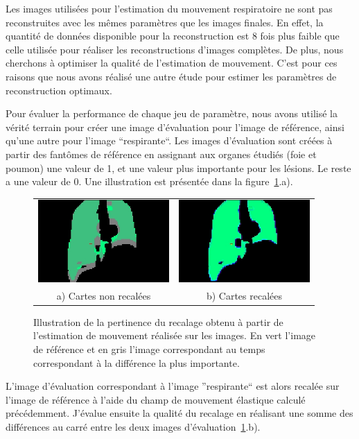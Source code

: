 Les images utilisées pour l'estimation du mouvement respiratoire ne sont pas reconstruites avec les mêmes paramètres que les images finales. En effet, la quantité de données disponible pour la reconstruction est 8 fois plus faible que celle utilisée pour réaliser les reconstructions d'images complètes. De plus, nous cherchons à optimiser la qualité de l'estimation de mouvement. C'est pour ces raisons que nous avons réalisé une autre étude pour estimer les paramètres de reconstruction optimaux. 

Pour évaluer la performance de chaque jeu de paramètre, nous avons utilisé la vérité terrain pour créer une image d'évaluation pour l'image de référence, ainsi qu'une autre pour l'image ``respirante``. Les images d'évaluation sont créées à partir des fantômes de référence en assignant aux organes étudiés (foie et poumon) une valeur de 1, et une valeur plus importante pour les lésions. Le reste a une valeur de 0. Une illustration est présentée dans la figure~\ref{lab:illustrationRecalage}.a). 

\begin{figure}
\centering
\begin{tabular}{c c}
	\includegraphics[width=5cm]{images/sansCorrection} & \includegraphics[width=5cm]{images/avecCorrection} \\
	a) Cartes non recalées				& b) Cartes recalées
\end{tabular}
\caption[Illustration du recalage obtenu]{Illustration de la pertinence du recalage obtenu à partir de l'estimation de mouvement réalisée sur les images. En vert l'image de référence et en gris l'image correspondant au temps correspondant à la différence la plus importante. }
\label{lab:illustrationRecalage}
\end{figure}

L'image d'évaluation correspondant à l'image ''respirante`` est alors recalée sur l'image de référence à l'aide du champ de mouvement élastique calculé précédemment. J'évalue ensuite la qualité du recalage en réalisant une somme des différences au carré entre les deux images d'évaluation~\ref{lab:illustrationRecalage}.b).

